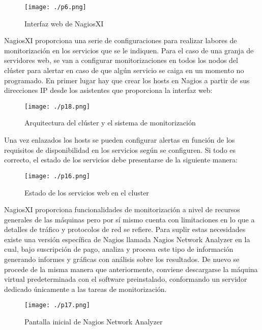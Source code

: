 \documentclass[paper=a4, fontsize=12pt]{scrartcl} %
\begin{document}
\begin{figure}[H] %
	\centering
	\label{lsblk}
	\texttt{[image: ./p6.png]}
	\caption{Interfaz web de NagiosXI} 
\end{figure}

NagiosXI proporciona una serie de configuraciones para realizar labores de monitorización en los servicios que se le indiquen. Para el caso de una granja de servidores web, se van a configurar monitorizaciones en todos los nodos del clúster para alertar en caso de que algún servicio se caiga en un momento no programado.
En primer lugar hay que crear los hosts en Nagios a partir de sus direcciones IP desde los asistentes que proporciona la interfaz web:

\begin{figure}[H] %
	\centering
	\label{lsblk}
	\texttt{[image: ./p18.png]}
	\caption{Arquitectura del clúster y el sistema de monitorización} 
\end{figure}

Una vez enlazados los hosts se pueden configurar alertas en función de los requisitos de disponibilidad en los servicios según se configuren. Si todo es correcto, el estado de los servicios debe presentarse de la siguiente manera:

\begin{figure}[H] %
	\centering
	\label{lsblk}
	\texttt{[image: ./p16.png]}
	\caption{Estado de los servicios web en el cluster} 
\end{figure}

NagiosXI proporciona funcionalidades de monitorización a nivel de recursos generales de las máquinas pero por sí mismo cuenta con limitaciones en lo que a detalles de tráfico y protocolos de red se refiere. Para suplir estas necesidades existe una versión específica de Nagios llamada Nagios Network Analyzer en la cual, bajo suscripción de pago, analiza y procesa este tipo de información generando informes y gráficas con análisis sobre los resultados.
De nuevo se procede de la misma manera que anteriormente, conviene descargarse la máquina virtual predeterminada con el software preinstalado, conformando un servidor dedicado únicamente a las tareas de monitorización.

\begin{figure}[H] %
	\centering
	\label{lsblk}
	\texttt{[image: ./p17.png]}
	\caption{Pantalla inicial de Nagios Network Analyzer} 
\end{figure}
\end{document}
